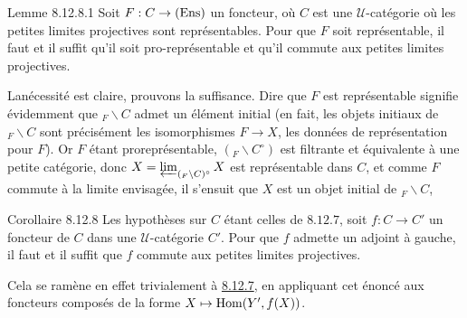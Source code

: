 \documentclass[10pt]{../fichiers-configuration-latex/smfart}
\begin{document}
\begin{enonce*}{Lemme 8.12.8.1}
Soit $F:C\rightarrow(\operatorname{Ens})$ un foncteur, où $C$ est une
$𝒰$-catégorie où les petites limites projectives sont
représentables. Pour que $F$ soit représentable, il faut et il
suffit qu'il soit pro-représentable et qu'il commute aux petites
limites projectives.
\end{enonce*}

La\pageoriginale nécessité est claire, prouvons la suffisance. Dire
que $F$ est représentable signifie évidemment que ${}_F\backslash C$
admet un élément initial (en fait, les objets initiaux de
${}_F\backslash C$ sont précisément les isomorphismes $F\rightarrow
X$, \ie les données de représentation pour $F$). Or $F$ étant
proreprésentable, $({}_F\backslash C^\circ)$ est filtrante et
équivalente à une petite catégorie, donc
$X=\varprojlim_{({}_F\backslash C)^\circ} X$ est représentable dans
$C$, et comme $F$ commute à la limite envisagée, il s'ensuit que $X$
est un objet initial de ${}_F\backslash C$, \cqfd

\begin{enonce*}{Corollaire 8.12.8}
Les hypothèses sur $C$ étant celles de $8.12.7$, soit
$f:C\rightarrow C'$ un foncteur de $C$ dans une
$𝒰$-catégorie $C'$. Pour que $f$ admette un adjoint à
gauche, il faut et il suffit que $f$ commute aux petites limites
projectives.
\end{enonce*}

Cela se ramène en effet trivialement à \hyperref[I.cor8.12.7]{8.12.7}, en appliquant cet
énoncé aux foncteurs composés de la forme $X\mapsto \Hom(%
Y',f(X))$.
\end{document}
